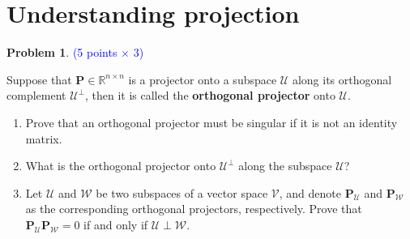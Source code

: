 \documentclass[english,onecolumn]{IEEEtran}
\newcommand{\Rbb}{\mathbb{R}}
\newcommand{\Pb}{\mathbf{P}}
\newcommand{\Ucal}{\mathcal{U}}
\newcommand{\Wcal}{\mathcal{W}}
\begin{document}
\section{Understanding projection}
\noindent\textbf{Problem 1}. \textcolor{blue}{(5 points $\times$ 3)}

Suppose that $\Pb\in \Rbb^{n\times n}$ is a projector onto a subspace $\mathcal{U}$ along its orthogonal complement $\mathcal{U}^{\perp}$, then it is called the \textbf{orthogonal projector} onto $\Ucal$.
\begin{enumerate}
    \item Prove that an orthogonal projector must be singular if it is not an identity matrix.
	\item What is the orthogonal projector onto $\mathcal{U}^{\perp}$ along the subspace $\mathcal{U}$?
    \item Let $\Ucal$ and $\Wcal$ be two subspaces of a vector space $\mathcal{V}$, and denote $\Pb_{\Ucal}$ and $\Pb_{\Wcal}$ as the corresponding orthogonal projectors, respectively. Prove that $\Pb_{\Ucal} \Pb_{\Wcal} = 0$ if and only if $\Ucal \perp \Wcal$.
\end{enumerate}
\end{document}
